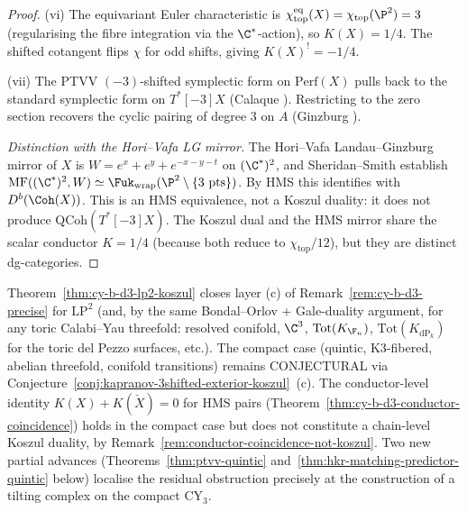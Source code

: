 \begin{proof}
(vi) The equivariant Euler characteristic is $\chi^{\mathrm{eq}}_{\mathrm{top}}(X) = \chi_{\mathrm{top}}(\P^2) = 3$ (regularising the fibre integration via the $\C^*$-action), so $K(X) = 1/4$. The shifted cotangent flips $\chi$ for odd shifts, giving $K(X)^! = -1/4$.

(vii) The PTVV $(-3)$-shifted symplectic form on $\mathrm{Perf}(X)$ \cite{PTVV2013} pulls back to the standard symplectic form on $T^*[-3]X$ (Calaque \cite{Calaque2015}). Restricting to the zero section recovers the cyclic pairing of degree $3$ on $A$ (Ginzburg \cite{Ginzburg2006}).

\medskip
\noindent\textit{Distinction with the Hori--Vafa LG mirror.} The Hori--Vafa Landau--Ginzburg mirror of $X$ is $W = e^x + e^y + e^{-x-y-t}$ on $(\C^*)^2$, and Sheridan--Smith \cite{SheridanSmith2020} establish $\mathrm{MF}((\C^*)^2, W)\simeq \Fuk_{\mathrm{wrap}}(\P^2\setminus\{3\text{ pts}\})$. By HMS this identifies with $D^b(\Coh(X))$. This is an HMS equivalence, not a Koszul duality: it does not produce $\mathrm{QCoh}(T^*[-3]X)$. The Koszul dual and the HMS mirror share the scalar conductor $K = 1/4$ (because both reduce to $\chi_{\mathrm{top}}/12$), but they are distinct dg-categories.
\end{proof}

\begin{remark}[Layer (c) of CY-B at \texorpdfstring{$d=3$}{d=3} after Theorem~\ref{thm:cy-b-d3-lp2-koszul}]
\label{rem:cy-b-d3-layer-c-after-lp2}
Theorem~\ref{thm:cy-b-d3-lp2-koszul} closes layer (c) of Remark~\ref{rem:cy-b-d3-precise} for $\mathrm{LP}^2$ (and, by the same Bondal--Orlov + Gale-duality argument, for any toric Calabi--Yau threefold: resolved conifold, $\C^3$, $\mathrm{Tot}(K_{\F_n})$, $\mathrm{Tot}(K_{\mathrm{dP}_k})$ for the toric del Pezzo surfaces, etc.). The compact case (quintic, K3-fibered, abelian threefold, conifold transitions) remains CONJECTURAL via Conjecture~\ref{conj:kapranov-3shifted-exterior-koszul}~(c). The conductor-level identity $K(X) + K(\check X) = 0$ for HMS pairs (Theorem~\ref{thm:cy-b-d3-conductor-coincidence}) holds in the compact case but does not constitute a chain-level Koszul duality, by Remark~\ref{rem:conductor-coincidence-not-koszul}. Two new partial advances (Theorems~\ref{thm:ptvv-quintic} and~\ref{thm:hkr-matching-predictor-quintic} below) localise the residual obstruction precisely at the construction of a tilting complex on the compact CY$_3$.
\end{remark}

